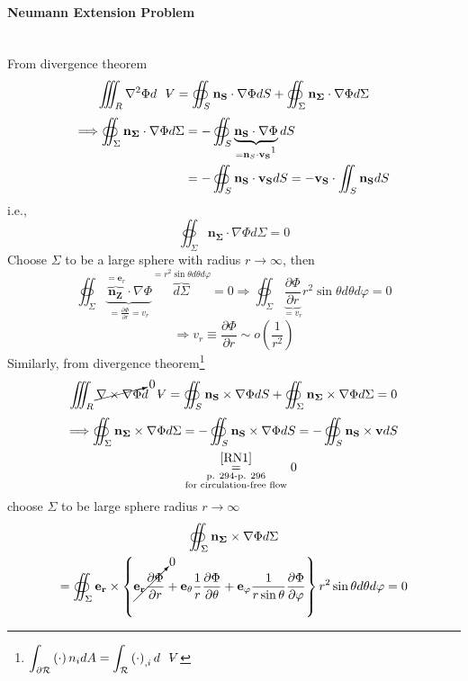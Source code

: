 \paragraph*{Neumann Extension Problem}\mbox{}\\
From divergence theorem
\[
\iiint_R\nabla^2\Phi d\volume = \oiint_S\mathbf{n_S}\cdot\nabla\Phi dS + \oiint_\Sigma\mathbf{n_{\Sigma}}\cdot\nabla\Phi d\Sigma
\]
\begin{align*}
\Longrightarrow
\oiint_\Sigma\mathbf{n_\Sigma}\cdot\nabla\Phi d\Sigma
&= -\oiint_S\underbrace{\mathbf{n_S}\cdot\nabla\Phi}_{=\mathbf{n}_S\cdot\mathbf{v_S\footnotemark}} dS \\
&= -\oiint_S\mathbf{n_S}\cdot\mathbf{v_S}dS = -\mathbf{v_S}\cdot\iint_S\mathbf{n_S}dS
\end{align*}
i.e., 
\[
\oiint_\Sigma\mathbf{n_\Sigma}\cdot\nabla\Phi d\Sigma = 0
\]
Choose $\Sigma$ to be a large sphere with radius $r\to\infty$, then 
\[
\oiint_\Sigma\underbrace{\overbrace{\mathbf{n_Z}}^{=\mathbf{e}_r}\cdot\nabla\Phi}_{\displaystyle = \frac{\partial\Phi}{\partial r} = v_r}\overbrace{d\Sigma}^{=r^2\sin\theta d\theta d\varphi} = 0\Longrightarrow \oiint_\Sigma\underbrace{\frac{\partial\Phi}{\partial r}}_{=v_r}r^2\sin\theta d\theta d\varphi = 0
\]
\begin{equation}
\Longrightarrow v_r\equiv \frac{\partial\Phi}{\partial r}\sim o\left(\frac{1}{r^2}\right)
\end{equation}
Similarly, from divergence theorem\footnote{$\displaystyle\int_{\partial\mathcal{R}}\left(\cdot\right)n_idA = \int_\mathcal{R}\left(\cdot\right)_{,i}d\volume$}
\[
\iiint_R\cancelto{0}{\nabla\times\nabla\Phi}d\volume = \oiint_S\mathbf{n_S}\times\nabla\Phi dS + \oiint_\Sigma\mathbf{n_\Sigma}\times\nabla\Phi d\Sigma = 0
\]
\begin{align*}
\Longrightarrow
\oiint_\Sigma\mathbf{n_\Sigma}\times\nabla\Phi d\Sigma 
&= -\oiint_S\mathbf{n_S}\times\nabla\Phi dS = -\oiint_S\mathbf{n_S}\times\mathbf{v}dS\\ \
&\vc{=}{\cite{RN1}}{
\begin{subarray}{c}
  \text{p. 294-p. 296}\\
  \text{for circulation-free flow}
\end{subarray}
}0
\end{align*}
choose $\Sigma$ to be large sphere radius $r\to\infty$
\begin{multline*}
\oiint_\Sigma\mathbf{n_\Sigma}\times\nabla\Phi d\Sigma\\ = \oiint_\Sigma\mathbf{e_r}\times\left\{\cancelto{0}{\mathbf{e_r}\frac{\partial\Phi}{\partial r}} + \mathbf{e_\theta}\frac{1}{r}\frac{\partial\Phi}{\partial\theta} + \mathbf{e_\varphi}\frac{1}{r\sin\theta}\frac{\partial\Phi}{\partial\varphi}\right\}r^2\sin\theta d\theta d\varphi = 0
\end{multline*}
